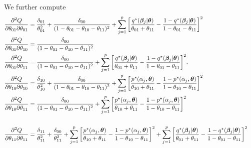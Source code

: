 We further compute
\begin{align*}
\frac{\partial^{2} Q}{\partial \theta_{01} \partial \theta_{01}} &= \frac{\delta_{01}}{\theta_{01}^{2}} + \frac{\delta_{00}}{(1 - \theta_{01} - \theta_{10} - \theta_{11})^{2}} + \sum_{j = 1}^{p}{\left[\frac{q^{\star}(\boldsymbol{\beta}_{j}\vert\boldsymbol{\theta})}{\theta_{01} + \theta_{11}} - \frac{1 - q^{\star}(\boldsymbol{\beta}_{j}\vert \boldsymbol{\theta})}{1 - \theta_{01} - \theta_{11}}\right]^{2}} \\
\frac{\partial^{2} Q}{\partial \theta_{01}\partial \theta_{10}} &= \frac{\delta_{00}}{(1 - \theta_{01} - \theta_{10} - \theta_{11})^{2}} \\
\frac{\partial^{2} Q}{\partial \theta_{01}\partial \theta_{11}} &= \frac{\delta_{00}}{(1 - \theta_{01} - \theta_{10} - \theta_{11})^{2}} + \sum_{j = 1}^{p}{\left[\frac{q^{\star}(\boldsymbol{\beta}_{j}\vert\boldsymbol{\theta})}{\theta_{01} + \theta_{11}} - \frac{1 - q^{\star}(\boldsymbol{\beta}_{j}\vert \boldsymbol{\theta})}{1 - \theta_{01} - \theta_{11}}\right]^{2}}.
~ & ~ \\
\frac{\partial^{2} Q}{\partial \theta_{10}\partial\theta_{10}} &= \frac{\delta_{10}}{\theta_{10}^{2}} + \frac{\delta_{00}}{(1 - \theta_{01} - \theta_{10} - \theta_{11})^{2}} +\sum_{j = 1}^{p}{\left[\frac{p^{\star}(\alpha_{j}, \boldsymbol{\theta})}{\theta_{10} + \theta_{11}} - \frac{1 - p^{\star}(\alpha_{j}, \boldsymbol{\theta})}{1 - \theta_{10} - \theta_{11}}\right]^{2}} \\
\frac{\partial^{2} Q}{\partial \theta_{10}\partial\theta_{11}} &= \frac{\delta_{00}}{(1 - \theta_{01} - \theta_{10} - \theta_{11})^{2}} + \sum_{j = 1}^{p}{\left[\frac{p^{\star}(\alpha_{j}, \boldsymbol{\theta})}{\theta_{10} + \theta_{11}} - \frac{1 - p^{\star}(\alpha_{j}, \boldsymbol{\theta})}{1 - \theta_{10} - \theta_{11}}\right]^{2}} \\
~ & ~ \\
\frac{\partial^{2} Q}{\partial \theta_{11}\partial \theta_{11}} &= \frac{\delta_{11}}{\theta_{11}^{2}} + \frac{\delta_{00}}{\theta_{11}^{2}} +  \sum_{j = 1}^{p}{\left[\frac{p^{\star}(\alpha_{j}, \boldsymbol{\theta})}{\theta_{10} + \theta_{11}} - \frac{1 - p^{\star}(\alpha_{j}, \boldsymbol{\theta})}{1 - \theta_{10} - \theta_{11}}\right]^{2}} + \sum_{j = 1}^{p}{\left[\frac{q^{\star}(\boldsymbol{\beta}_{j}\vert\boldsymbol{\theta})}{\theta_{01} + \theta_{11}} - \frac{1 - q^{\star}(\boldsymbol{\beta}_{j}\vert \boldsymbol{\theta})}{1 - \theta_{01} - \theta_{11}}\right]^{2}}
\end{align*}

